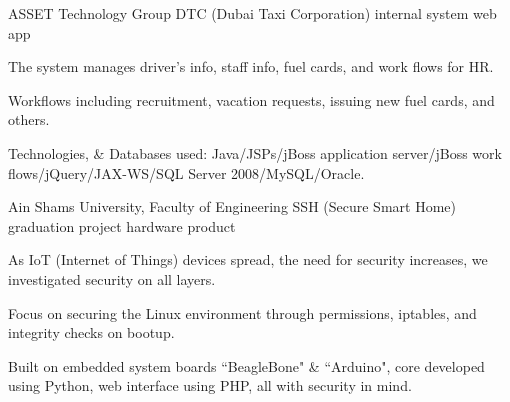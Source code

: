 \begin{cventries}
  \cventry
    {ASSET Technology Group} %
    {DTC (Dubai Taxi Corporation)} %
    {internal system} %
    {web app} %
    {
      \begin{cvitems} %
        \item {The system manages driver's info, staff info, fuel cards, and work flows for HR.}
        \item {Workflows including recruitment, vacation requests, issuing new fuel cards, and others.}
        \item {Technologies, \& Databases used: Java/JSPs/jBoss application server/jBoss work flows/jQuery/JAX-WS/SQL Server 2008/MySQL/Oracle.}
      \end{cvitems}
    }


  \cventry
    {Ain Shams University, Faculty of Engineering} %
    {SSH (Secure Smart Home)} %
    {graduation project} %
    {hardware product} %
    {
      \begin{cvitems} %
        \item {As IoT (Internet of Things) devices spread, the need for security increases, we investigated security on all layers.}
        \item {Focus on securing the Linux environment through permissions, iptables, and integrity checks on bootup.}
        \item {Built on embedded system boards ``BeagleBone" \& ``Arduino", core developed using Python, web interface using PHP, all with security in mind.}
      \end{cvitems}
    }


\end{cventries}

